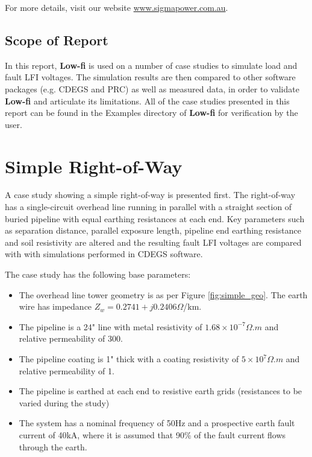 \documentclass{article}
\begin{document}
For more details, visit our website \href{http://www.sigmapower.com.au}{www.sigmapower.com.au}.

\subsection{Scope of Report}
In this report, \textbf{Low-fi} is used on a number of case studies to simulate load and fault LFI voltages. The simulation results are then compared to other software packages (e.g. CDEGS and PRC) as well as measured data, in order to validate \textbf{Low-fi} and articulate its limitations. All of the case studies presented in this report can be found in the Examples directory of \textbf{Low-fi} for verification by the user.

\newpage
\section{Simple Right-of-Way}
A case study showing a simple right-of-way is presented first. The right-of-way has a single-circuit overhead line running in parallel with a straight section of buried pipeline with equal earthing resistances at each end. Key parameters such as separation distance, parallel exposure length, pipeline end earthing resistance and soil resistivity are altered and the resulting fault LFI voltages are compared with with simulations performed in CDEGS software.

The case study has the following base parameters:
\begin{itemize}
\item The overhead line tower geometry is as per Figure \ref{fig:simple_geo}. The earth wire has impedance $Z_{w} = 0.2741 + j0.2406 \Omega$/km. 
\item The pipeline is a 24" line with metal resistivity of $1.68 \times 10^{-7} \Omega.m$ and relative permeability of 300.
\item The pipeline coating is 1" thick with a coating resistivity of $5 \times 10^{7} \Omega.m$ and relative permeability of 1. 
\item The pipeline is earthed at each end to resistive earth grids (resistances to be varied during the study)
\item The system has a nominal frequency of 50Hz and a prospective earth fault current of 40kA, where it is assumed that 90\% of the fault current flows through the earth. 
\end{itemize}
\end{document}

